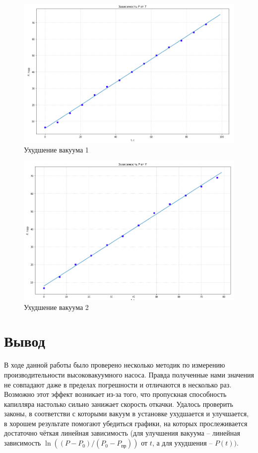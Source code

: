 \documentclass[a4paper,12pt]{article}
\begin{document}
\begin{figure} [h!]
	\caption{Ухудшение  вакуума 1}
	\centering 
	\includegraphics[scale=0.4]{33.jpg} 
\end{figure}

\begin{figure} [h!]
	\caption{Ухудшение  вакуума 2}
	\centering 
	\includegraphics[scale=0.4]{44.jpg} 
\end{figure}
\section*{Вывод}

В ходе данной работы было проверено несколько методик по измерению производительности высоковакуумного насоса. Правда полученные нами значения не совпадают даже в пределах погрешности и отличаются в несколько раз. Возможно этот эффект возникает из-за того, что пропускная способность капилляра настолько сильно занижает скорость откачки.  Удалось проверить законы, в соответстви с которыми вакуум в установке ухудшается и улучшается, в хорошем результате помогают убедиться графики, на которых прослеживается достаточно чёткая линейная зависимость (для улучшения вакуума -- линейная зависимость $\ln ((P-P_0) / (P_0 - P_{пр}))$ от $t$, а для ухудшения -- $P(t))$.  
\end{document}
